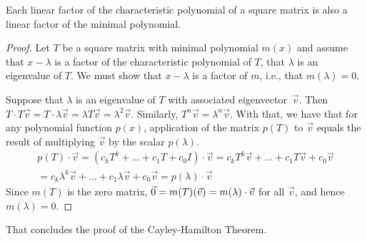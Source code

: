 \begin{lemma}
Each linear factor of the characteristic polynomial of a square matrix
is also a linear factor of the minimal polynomial.
\end{lemma}

\begin{proof}
Let \( T \) be a square matrix with minimal polynomial \( m(x) \) and 
assume that \( x-\lambda \) is a factor of the characteristic polynomial of 
\( T \), that \( \lambda \) is an eigenvalue of \( T \).
We must show that $x-\lambda$ is a factor of $m$, i.e., that 
$m(\lambda)=0$.

Suppose that $\lambda$ is an eigenvalue of $T$ with associated 
eigenvector~$\vec{v}$.
Then
$T\cdot T\vec{v}=T\cdot\lambda\vec{v}=\lambda T\vec{v}=\lambda^2\vec{v}$.
Similarly, $T^n\vec{v}=\lambda^n\vec{v}$.
With that, we have that 
for any polynomial function \( p(x) \), application of the matrix \( p(T) \)
to \( \vec{v} \) equals the result of multiplying \( \vec{v} \) by the scalar
\( p(\lambda) \).
\begin{multline*}
  p(T)\cdot\vec{v}
  =(c_kT^k+\dots+c_1T+c_0I)\cdot\vec{v}
  =c_kT^k\vec{v}+\dots+c_1T\vec{v}+c_0\vec{v}  \\
  =c_k\lambda^k\vec{v}+\dots+c_1\lambda\vec{v}+c_0\vec{v}
  =p(\lambda)\cdot\vec{v}
\end{multline*}
Since \( m(T) \) is the zero matrix,
\( \vec{0}=m(T)(\vec{v})=m(\lambda)\cdot\vec{v} \)
for all $\vec{v}$, and
hence \( m(\lambda)=0 \).
\end{proof}

That concludes the proof of the Cayley-Hamilton Theorem.

